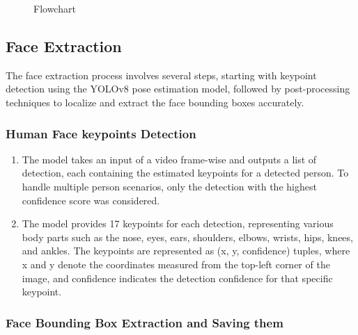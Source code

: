 \begin{figure}[H]
    \centering
    \caption{Flowchart}
    \label{fig:enter-label}
\end{figure}

\subsection{Face Extraction}
The face extraction process involves several steps, starting with keypoint detection using the YOLOv8 pose estimation model, followed by post-processing techniques to localize and extract the face bounding boxes accurately.

\subsubsection{Human Face keypoints Detection}

\begin{enumerate}
    \item The model takes an input of a video frame-wise and outputs a list of detection, each containing the estimated keypoints for a detected person. To handle multiple person scenarios, only the detection with the highest confidence score was considered.
    \item The model provides 17 keypoints for each detection, representing various body parts such as the nose, eyes, ears, shoulders, elbows, wrists, hips, knees, and ankles. The keypoints are represented as (x, y, confidence) tuples, where x and y denote the coordinates measured from the top-left corner of the image, and confidence indicates the detection confidence for that specific keypoint.
\end{enumerate}

\subsubsection{Face Bounding Box Extraction and Saving them}


